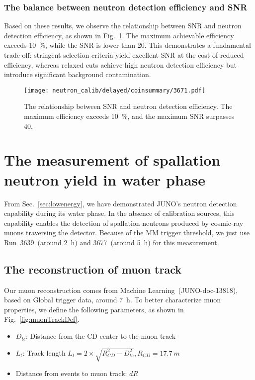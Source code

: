 \subsection{The balance between neutron detection efficiency and SNR}
Based on these results, we observe the relationship between SNR and neutron detection efficiency, as shown in Fig.~\ref{fig:snr-efficiency}. The maximum achievable efficiency exceeds \SI{10}{\%}, while the SNR is lower than 20. This demonstrates a fundamental trade-off: stringent selection criteria yield excellent SNR at the cost of reduced efficiency, whereas relaxed cuts achieve high neutron detection efficiency but introduce significant background contamination.
\begin{figure}[htbp]
	\centering
	\texttt{[image: neutron\_calib/delayed/coinsummary/3671.pdf]}
	\caption{The relationship between SNR and neutron detection efficiency. The maximum efficiency exceeds \SI{10}{\%}, and the maximum SNR surpasses 40.}
	\label{fig:snr-efficiency}
\end{figure}

\chapter{The measurement of spallation neutron yield in water phase}
From Sec.~\ref{sec:lowenergy}, we have demonstrated JUNO's neutron detection capability during its water phase. In the absence of calibration sources, this capability enables the detection of spallation neutrons produced by cosmic-ray muons traversing the detector. Because of the MM trigger threshold, we just use Run~3639~(around \SI{2}{h}) and 3677~(around \SI{5}{h}) for this measurement.
\section{The reconstruction of muon track}
Our muon reconstruction comes from Machine Learning~(JUNO-doc-13818), based on Global trigger data, around \SI{7}{h}.
To better characterize muon properties, we define the following parameters, as shown in Fig.~\ref{fig:muonTrackDef}.
\begin{itemize}
	\item $D_{tc}$: Distance from the CD center to the muon track
	\item $L_t$: Track length $L_t=2\times\sqrt{R^2_{CD}-D^2_{tc}}, R_{CD}=\SI{17.7}{m}$
	\item Distance from events to muon track: $dR$
\end{itemize}

